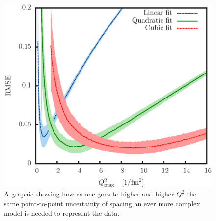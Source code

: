 \documentclass[10pt,superscriptaddress,aps,prc,twocolumn]{revtex4-1}
\begin{document}
\begin{figure}[htbp]
\includegraphics[width=\columnwidth]{Figure/PlotBiasVariance-2.eps}
\caption{A graphic showing how as one goes to higher and higher $Q^2$ the same point-to-point uncertainty of spacing 
         an ever more complex model is needed to represent the data.}
\label{mihaplot}
\end{figure}
\end{document}
